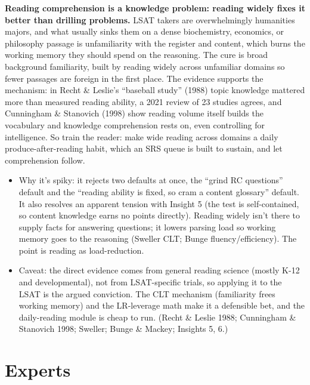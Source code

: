 \documentclass[11pt]{article}
\begin{document}
\textbf{Reading comprehension is a knowledge problem: reading widely fixes it better than drilling problems.} LSAT takers are overwhelmingly humanities majors, and what usually sinks them on a dense biochemistry, economics, or philosophy passage is unfamiliarity with the register and content, which burns the working memory they should spend on the reasoning. The cure is broad background familiarity, built by reading widely across unfamiliar domains so fewer passages are foreign in the first place. The evidence supports the mechanism: in Recht \& Leslie's \enquote{baseball study} (1988) topic knowledge mattered more than measured reading ability, a 2021 review of 23 studies agrees, and Cunningham \& Stanovich (1998) show reading volume itself builds the vocabulary and knowledge comprehension rests on, even controlling for intelligence. So train the reader: make wide reading across domains a daily produce-after-reading habit, which an SRS queue is built to sustain, and let comprehension follow.

\begin{itemize}
\item Why it's spiky: it rejects two defaults at once, the \enquote{grind RC questions} default and the \enquote{reading ability is fixed, so cram a content glossary} default. It also resolves an apparent tension with Insight 5 (the test is self-contained, so content knowledge earns no points directly). Reading widely isn't there to supply facts for answering questions; it lowers parsing load so working memory goes to the reasoning (Sweller CLT; Bunge fluency/efficiency). The point is reading as load-reduction.
\item Caveat: the direct evidence comes from general reading science (mostly K-12 and developmental), not from LSAT-specific trials, so applying it to the LSAT is the argued conviction. The CLT mechanism (familiarity frees working memory) and the LR-leverage math make it a defensible bet, and the daily-reading module is cheap to run. (Recht \& Leslie 1988; Cunningham \& Stanovich 1998; Sweller; Bunge \& Mackey; Insights 5, 6.)
\end{itemize}

\section*{Experts}
\end{document}
